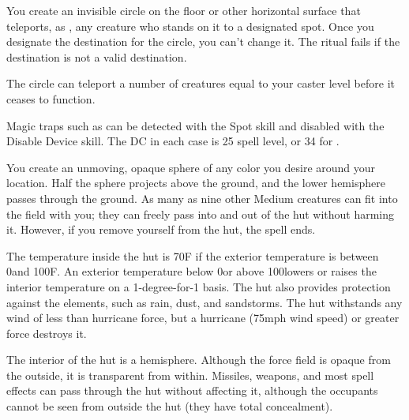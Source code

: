\begin{spelleffect}
You create an invisible circle on the floor or other horizontal surface that teleports, as , any creature who stands on it to a designated spot. Once you designate the destination for the circle, you can't change it. The ritual fails if the destination is not a valid destination.
\par The circle can teleport a number of creatures equal to your caster level before it ceases to function.
\end{spelleffect}
\begin{spellnotes}
Magic traps such as  can be detected with the Spot skill and disabled with the Disable Device skill. The DC in each case is 25 \add spell level, or 34 for .
\end{spellnotes}

\begin{spelleffect}
You create an unmoving, opaque sphere of any color you desire around your location. Half the sphere projects above the ground, and the lower hemisphere passes through the ground. As many as nine other Medium creatures can fit into the field with you; they can freely pass into and out of the hut without harming it. However, if you remove yourself from the hut, the spell ends.
\par The temperature inside the hut is 70\degree F if the exterior temperature is between 0\degree and 100\degree F. An exterior temperature below 0\degree or above 100\degree lowers or raises the interior temperature on a 1-degree-for-1 basis. The hut also provides protection against the elements, such as rain, dust, and sandstorms. The hut withstands any wind of less than hurricane force, but a hurricane (75\add mph wind speed) or greater force destroys it.
\par The interior of the hut is a hemisphere. Although the force field is opaque from the outside, it is transparent from within. Missiles, weapons, and most spell effects can pass through the hut without affecting it, although the occupants cannot be seen from outside the hut (they have total concealment).
\end{spelleffect}

